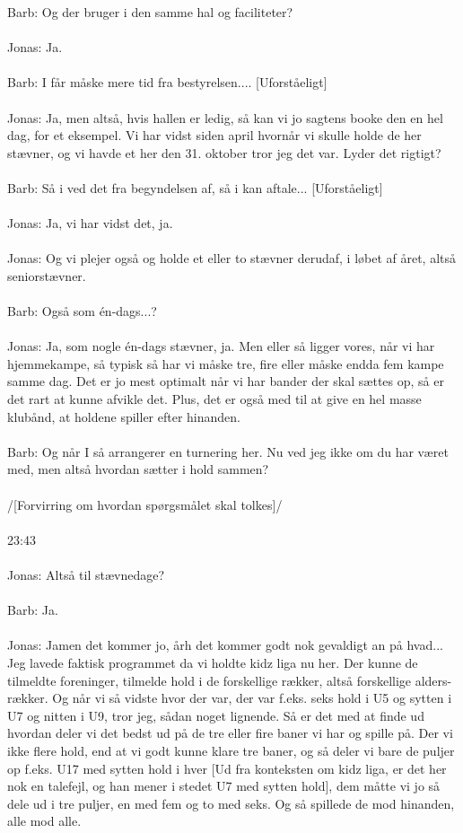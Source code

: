 Barb: Og der bruger i den samme hal og faciliteter?
\\\\
Jonas: Ja.
\\\\
Barb: I får måske mere tid fra bestyrelsen.... [Uforståeligt]
\\\\
Jonas: Ja, men altså, hvis hallen er ledig, så kan vi jo sagtens booke den en hel dag, for et eksempel. Vi har vidst siden april hvornår vi skulle holde de her stævner, og vi havde et her den 31. oktober tror jeg det var. Lyder det rigtigt? 
\\\\
Barb: Så i ved det fra begyndelsen af, så i kan aftale... [Uforståeligt]
\\\\
Jonas: Ja, vi har vidst det, ja.
\\\\
Jonas: Og vi plejer også og holde et eller to stævner derudaf, i løbet af året, altså seniorstævner.
\\\\
Barb: Også som én-dags...?
\\\\
Jonas: Ja, som nogle én-dags stævner, ja. Men eller så ligger vores, når vi har hjemmekampe, så typisk så har vi måske tre, fire eller måske endda fem kampe samme dag. Det er jo mest optimalt når vi har bander der skal sættes op, så er det rart at kunne afvikle det. Plus, det er også med til at give en hel masse klubånd, at holdene spiller efter hinanden.
\\\\
Barb: Og når I så arrangerer en turnering her. Nu ved jeg ikke om du har været med, men altså hvordan sætter i hold sammen?
\\\\
/[Forvirring om hvordan spørgsmålet skal tolkes]/
\\\\
23:43
\\\\
Jonas: Altså til stævnedage? 
\\\\
Barb: Ja.
\\\\
Jonas: Jamen det kommer jo, årh det kommer godt nok gevaldigt an på hvad... Jeg lavede faktisk programmet da vi holdte kidz liga nu her. Der kunne de tilmeldte foreninger, tilmelde hold i de forskellige rækker, altså forskellige alders-rækker. Og når vi så vidste hvor der var, der var f.eks. seks hold i U5 og sytten i U7 og nitten i U9, tror jeg, sådan noget lignende. Så er det med at finde ud hvordan deler vi det bedst ud på de tre eller fire baner vi har og spille på. Der vi ikke flere hold, end at vi godt kunne klare tre baner, og så deler vi bare de puljer op f.eks. U17 med sytten hold i hver [Ud fra konteksten om kidz liga, er det her nok en talefejl, og han mener i stedet U7 med sytten hold], dem måtte vi jo så dele ud i tre puljer, en med fem og to med seks. Og så spillede de mod hinanden, alle mod alle.
